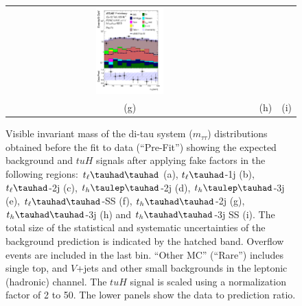 \documentclass[PAPER, coverpage, atlasdraft=true, texlive=2016, UKenglish]{\ATLASLATEXPATH atlasdoc}
\begin{document}
\begin{figure}[H]
\begin{tabular}{@{}ccc@{}}
\includegraphics[page=1,width=0.28\textwidth]{figures/mtt/tuH_reg2mtau1b3jss_log_mtt.pdf}\\
(g) & (h) & (i)\\
\end{tabular}
\caption{Visible invariant mass of the di-tau system ($m_{\tau\tau}$) distributions obtained before the fit to data (``Pre-Fit'') showing 
  the expected background and $tuH$ signals after applying fake factors in the following regions: $t_{\ell}\thadhad$ (a),
 $t_{\ell}\tauhad$-1j (b),  $t_{\ell}\tauhad$-2j (c), $t_h\tlhad$-2j (d), $t_h\tlhad$-3j (e), $t_{\ell}\thadhad$-SS (f), $t_h\thadhad$-2j (g), $t_h\thadhad$-3j (h) and $t_h\thadhad$-3j SS (i).
 The total size of the statistical and systematic uncertainties of the background prediction is indicated by the hatched band.
 Overflow events are included in the last bin. ``Other MC'' (``Rare'') includes single top, and $V$+jets and other small backgrounds in the leptonic (hadronic) channel. The $tuH$ signal is scaled using a normalization factor of 2 to 50.   
The lower panels show the data to prediction ratio.}
\label{fig:mtt}
\end{figure}
\end{document}

